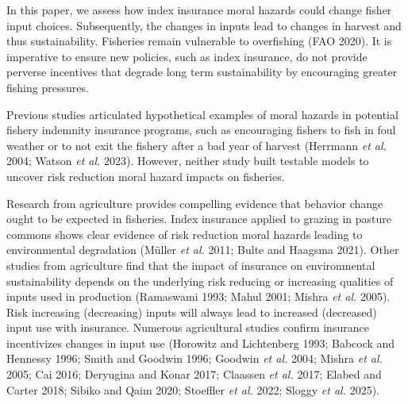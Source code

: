 \documentclass[
  letterpaper,
  DIV=11,
  numbers=noendperiod]{scrartcl}
\theoremstyle{plain}
\theoremstyle{plain}
\theoremstyle{remark}
\begin{document}
In this paper, we assess how index insurance moral hazards could change
fisher input choices. Subsequently, the changes in inputs lead to
changes in harvest and thus sustainability. Fisheries remain vulnerable
to overfishing (FAO 2020). It is imperative to ensure new policies, such
as index insurance, do not provide perverse incentives that degrade long
term sustainability by encouraging greater fishing pressures.

Previous studies articulated hypothetical examples of moral hazards in
potential fishery indemnity insurance programs, such as encouraging
fishers to fish in foul weather or to not exit the fishery after a bad
year of harvest (Herrmann \emph{et al.} 2004; Watson \emph{et al.}
2023). However, neither study built testable models to uncover risk
reduction moral hazard impacts on fisheries.

Research from agriculture provides compelling evidence that behavior
change ought to be expected in fisheries. Index insurance applied to
grazing in pasture commons shows clear evidence of risk reduction moral
hazards leading to environmental degradation (Müller \emph{et al.} 2011;
Bulte and Haagsma 2021). Other studies from agriculture find that the
impact of insurance on environmental sustainability depends on the
underlying risk reducing or increasing qualities of inputs used in
production (Ramaswami 1993; Mahul 2001; Mishra \emph{et al.} 2005). Risk
increasing (decreasing) inputs will always lead to increased (decreased)
input use with insurance. Numerous agricultural studies confirm
insurance incentivizes changes in input use (Horowitz and Lichtenberg
1993; Babcock and Hennessy 1996; Smith and Goodwin 1996; Goodwin
\emph{et al.} 2004; Mishra \emph{et al.} 2005; Cai 2016; Deryugina and
Konar 2017; Claassen \emph{et al.} 2017; Elabed and Carter 2018; Sibiko
and Qaim 2020; Stoeffler \emph{et al.} 2022; Sloggy \emph{et al.} 2025).
\end{document}
